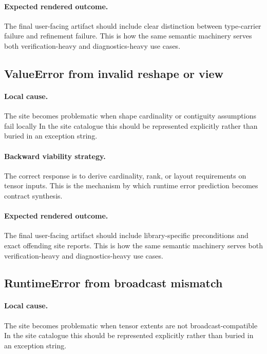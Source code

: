 \documentclass[11pt]{report}
\theoremstyle{definition}
\theoremstyle{plain}
\begin{document}
\paragraph{Expected rendered outcome.}
The final user-facing artifact should include clear distinction between type-carrier failure and refinement failure. This is how the same
semantic machinery serves both verification-heavy and diagnostics-heavy use
cases.

\subsection{ValueError from invalid reshape or view}

\paragraph{Local cause.}
The site becomes problematic when shape cardinality or contiguity assumptions fail locally In the site catalogue this should be
represented explicitly rather than buried in an exception string.

\paragraph{Backward viability strategy.}
The correct response is to derive cardinality, rank, or layout requirements on tensor inputs. This is the mechanism by which runtime
error prediction becomes contract synthesis.

\paragraph{Expected rendered outcome.}
The final user-facing artifact should include library-specific preconditions and exact offending site reports. This is how the same
semantic machinery serves both verification-heavy and diagnostics-heavy use
cases.

\subsection{RuntimeError from broadcast mismatch}

\paragraph{Local cause.}
The site becomes problematic when tensor extents are not broadcast-compatible In the site catalogue this should be
represented explicitly rather than buried in an exception string.
\end{document}
